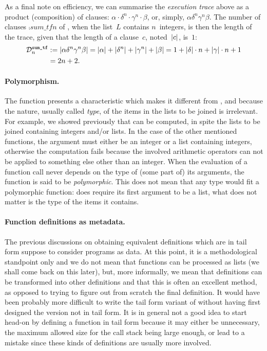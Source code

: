 As a final note on efficiency, we can summarise the \emph{execution
  trace} above as a product (composition) of clauses: \(\alpha \cdot
\delta^n \cdot \gamma^n \cdot \beta\), or, simply,
\(\alpha\delta^n\gamma^n\beta\). The number of clauses
\(\comp{sum\_tf}{n}\) of , when the list~\(L\)
contains \(n\)~integers, is then the length of the trace, given that
the length of a clause~\(c\), noted~\(\abs{c}\), is~\(1\):
\begin{align*}
\comp{sum\_tf}{n} 
  &:= \abs{\alpha\delta^n\gamma^n\beta}
   = \abs{\alpha} + \abs{\delta^n} + \abs{\gamma^n} + \abs{\beta}
   = 1 + \abs{\delta} \cdot n + \abs{\gamma} \cdot n + 1\\
   &= 2n + 2.
\end{align*}

\medskip

\paragraph{Polymorphism.}
\label{polymorphism}

The function  presents a characteristic which makes it
different from ,  and 
because the nature, usually called \emph{type}, of the items in the
lists to be joined is irrelevant. For example, we showed previously
that  can be computed, in spite the lists
to be joined containing integers and/or lists. In the case of the
other mentioned functions, the argument must either be an integer or a
list containing integers, otherwise the computation fails because the
involved arithmetic operators can not be applied to something else
other than an integer. When the evaluation of a function call never
depends on the type of (some part of) its arguments, the function is
said to be \emph{polymorphic}. This does not mean that any type would
fit a polymorphic function:  does require its first
argument to be a list, what does not matter is the type of the items
it contains.

\medskip

\paragraph{Function definitions as metadata.}

The previous discussions on obtaining equivalent definitions which are
in tail form suppose to consider programs as data. At this point, it
is a methodological standpoint only and we do not mean that functions
can be processed as lists (we shall come back on this later), but,
more informally, we mean that definitions can be transformed into
other definitions and that this is often an excellent method, as
opposed to trying to figure out from scratch the final definition. It
would have been probably more difficult to write the tail form variant
of  without having first designed the version not in
tail form. It is in general not a good idea to start head\hyp{}on by
defining a function in tail form because it may either be unnecessary,
the maximum allowed size for the call stack being large enough, or
lead to a mistake since these kinds of definitions are usually more
involved.

